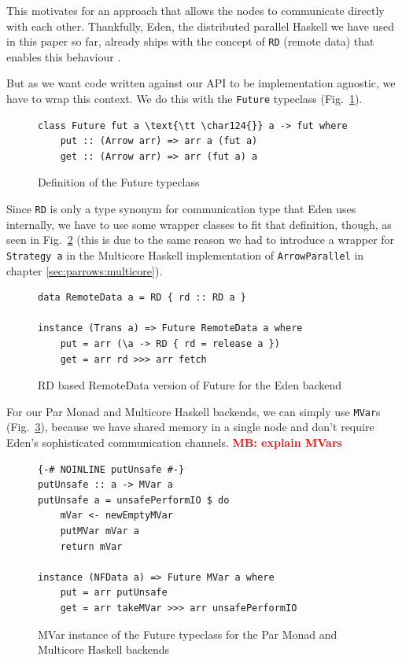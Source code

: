 \documentclass{jfp1}
\renewcommand{\cite}[1]{\citep{#1}}
\newcommand{\inlinecode}[1]{\texttt{#1}}
\newcommand{\comm}[2]{\textcolor{red}{\bfseries #1: #2}}
\newcommand{\mbcomment}[1]{\comm{MB}{#1}}
\newcommand{\fixme}{\mbcomment}
\begin{document}
This motivates for an approach that allows the nodes to communicate directly with each other. Thankfully, Eden, the distributed parallel Haskell we have used in this paper so far, already ships with the concept of \inlinecode{RD} (remote data) that enables this behaviour \cite{AlGo03a,Dieterle2010}.

But as we want code written against our API to be implementation agnostic, we have to wrap this context. We do this with the \inlinecode{Future} typeclass (Fig.~\ref{fig:future}).
\begin{figure}[h]
\begin{lstlisting}[frame=htrbl]
class Future fut a \text{\tt \char124{}} a -> fut where
    put :: (Arrow arr) => arr a (fut a)
    get :: (Arrow arr) => arr (fut a) a
\end{lstlisting}
\caption{Definition of the Future typeclass}
\label{fig:future}
\end{figure}
Since \inlinecode{RD} is only a type synonym for communication type that Eden uses internally, we have to use some wrapper classes to fit that definition, though, as seen in Fig.~\ref{fig:RDFuture} (this is due to the same reason we had to introduce a wrapper for \inlinecode{Strategy a} in the Multicore Haskell implementation of \inlinecode{ArrowParallel} in chapter \ref{sec:parrows:multicore}).
\begin{figure}[h]
\begin{lstlisting}[frame=htrbl]
data RemoteData a = RD { rd :: RD a }

instance (Trans a) => Future RemoteData a where
    put = arr (\a -> RD { rd = release a })
    get = arr rd >>> arr fetch
\end{lstlisting}
\caption{RD based RemoteData version of Future for the Eden backend}
\label{fig:RDFuture}
\end{figure}

For our Par Monad and Multicore Haskell backends, we can simply use \inlinecode{MVar}s \cite{jones1996concurrent} (Fig.~\ref{fig:MVarFuture}), because we have shared memory in a single node and don't require Eden's sophisticated communication channels. \fixme{explain MVars}
\begin{figure}[h]
\begin{lstlisting}[frame=htrbl]
{-# NOINLINE putUnsafe #-}
putUnsafe :: a -> MVar a
putUnsafe a = unsafePerformIO $ do
    mVar <- newEmptyMVar
    putMVar mVar a
    return mVar

instance (NFData a) => Future MVar a where
    put = arr putUnsafe
    get = arr takeMVar >>> arr unsafePerformIO
\end{lstlisting}
\caption{MVar instance of the Future typeclass for the Par Monad and Multicore Haskell backends}
\label{fig:MVarFuture}
\end{figure}
\end{document}
